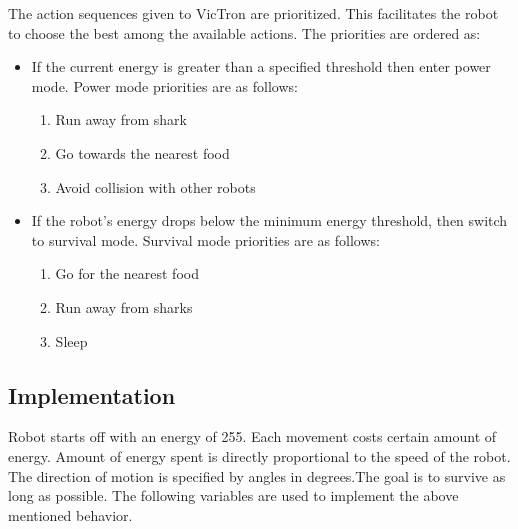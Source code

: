 \documentclass[12pt]{article}
\begin{document}
The action sequences given to VicTron are prioritized. This facilitates the robot to choose the best among the available actions. The priorities are ordered as:
\begin{itemize}
	\item If the current energy is greater than a specified threshold then enter power mode. Power mode priorities are as follows:
	\begin{enumerate}
		\item Run away from shark
		\item Go towards the nearest food
		\item Avoid collision with other robots
	\end{enumerate}
	\item If the robot's energy drops below the minimum energy threshold, then switch to survival mode. Survival mode priorities are as follows:
	\begin{enumerate}
		\item Go for the nearest food
		\item Run away from sharks
		\item Sleep
	\end{enumerate}
\end{itemize}

\subsection{Implementation}
Robot starts off with an energy of 255. Each movement costs certain amount of energy. Amount of energy spent is directly proportional to the speed of the robot. The direction of motion is specified by angles in degrees.The goal is to survive as long as possible. The following variables are used to implement the above mentioned behavior.
\end{document}
